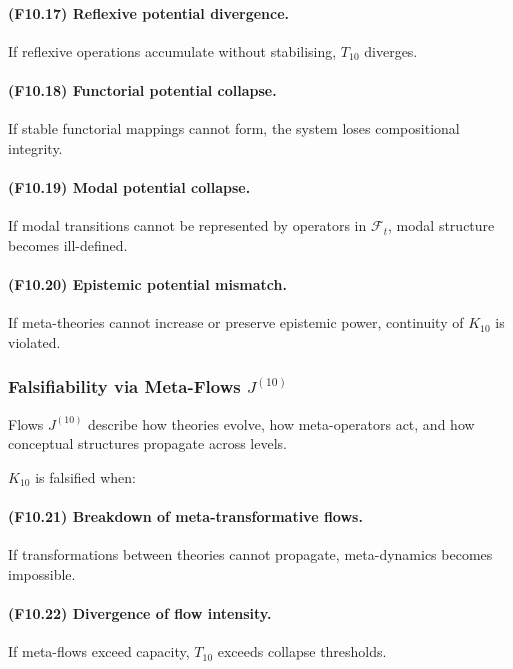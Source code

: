 \paragraph{(F10.17) Reflexive potential divergence.}
If reflexive operations accumulate without stabilising,
$T_{10}$ diverges.

\paragraph{(F10.18) Functorial potential collapse.}
If stable functorial mappings cannot form,
the system loses compositional integrity.

\paragraph{(F10.19) Modal potential collapse.}
If modal transitions cannot be represented by operators in $\mathcal{F}_t$,
modal structure becomes ill-defined.

\paragraph{(F10.20) Epistemic potential mismatch.}
If meta-theories cannot increase or preserve epistemic power,
continuity of $K_{10}$ is violated.



\subsubsection{Falsifiability via Meta-Flows $J^{(10)}$}

Flows $J^{(10)}$ describe how theories evolve, how meta-operators act,
and how conceptual structures propagate across levels.

$K_{10}$ is falsified when:

\paragraph{(F10.21) Breakdown of meta-transformative flows.}
If transformations between theories cannot propagate,
meta-dynamics becomes impossible.

\paragraph{(F10.22) Divergence of flow intensity.}
If meta-flows exceed capacity, $T_{10}$ exceeds collapse thresholds.

